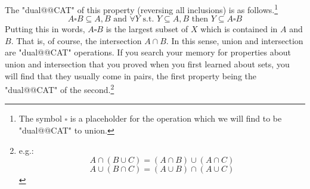 \documentclass[main.tex]{subfiles}
\begin{document}
\begin{exmp}
The "dual@@CAT" of this property (reversing all inclusions) is as follows.\footnote{The symbol $\square$ is a placeholder for the operation which we will find to be "dual@@CAT" to union.}
\[ A \square B \subseteq A, B \text{ and } \forall Y \text{ s.t. } Y \subseteq A,B \text{ then } Y \subseteq A \square B\]
Putting this in words, $A \square B$ is the largest subset of $X$ which is contained in $A$ and $B$. That is, of course, the intersection $A \cap B$. In this sense, union and intersection are "dual@@CAT" operations. If you search your memory for properties about union and intersection that you proved when you first learned about sets, you will find that they usually come in pairs, the first property being the "dual@@CAT" of the second.\footnote{e.g.: \[A \cap (B \cup C) = (A \cap B) \cup (A \cap C)\]\[A \cup (B \cap C) = (A \cup B) \cap (A \cup C)\]}
\end{exmp}
\end{document}
